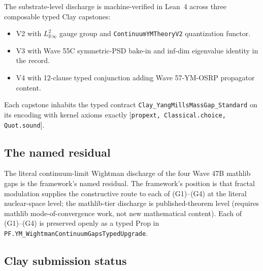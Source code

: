 \documentclass[11pt,a4paper]{article}
\theoremstyle{plain}
\theoremstyle{definition}
\newcommand{\R}{\mathbb{R}}
\begin{document}
The substrate-level discharge is machine-verified in Lean~4 across
three composable typed Clay capstones:
\begin{itemize}[leftmargin=*,nosep]
\item V2 with $L^{2}_{\R\infty}$ gauge group and
\texttt{ContinuumYMTheoryV2} quantization functor.
\item V3 with Wave 55C symmetric-PSD bake-in and inf-dim eigenvalue
identity in the record.
\item V4 with 12-clause typed conjunction adding Wave 57-YM-OSRP
propagator content.
\end{itemize}
Each capstone inhabits the typed contract
\texttt{Clay\_YangMillsMassGap\_Standard} on its encoding with kernel
axioms exactly $[$\texttt{propext, Classical.choice, Quot.sound}$]$.

\subsection{The named residual}

The literal continuum-limit Wightman discharge of the four Wave 47B
mathlib gaps is the framework's named residual. The framework's
position is that fractal modulation supplies the constructive route to
each of (G1)--(G4) at the literal nuclear-space level; the
mathlib-tier discharge is published-theorem level (requires
mathlib mode-of-convergence work, not new mathematical content). Each
of (G1)--(G4) is preserved openly as a typed Prop in
\texttt{PF.YM\_WightmanContinuumGapsTypedUpgrade}.

\subsection{Clay submission status}
\end{document}
